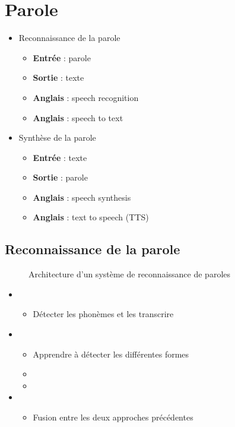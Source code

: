 \documentclass{KodeBook}
\begin{document}
\section{Parole}

\begin{itemize}
	\item Reconnaissance de la parole
	\begin{itemize}
		\item \textbf{Entrée} : parole
		\item \textbf{Sortie} : texte
		\item \textbf{Anglais} : speech recognition
		\item \textbf{Anglais} : speech to text
	\end{itemize}
	\item Synthèse de la parole
	\begin{itemize}
		\item \textbf{Entrée} : texte
		\item \textbf{Sortie} : parole
		\item \textbf{Anglais} : speech synthesis
		\item \textbf{Anglais} : text to speech (TTS)
	\end{itemize}
\end{itemize}

\subsection{Reconnaissance de la parole}


\begin{figure}
	\centering
	\caption{Architecture d'un système de reconnaissance de paroles \cite{18-haridas}}
\end{figure}

\begin{itemize}
	\item {}
	\begin{itemize}
		\item Détecter les phonèmes et les transcrire
	\end{itemize}
	\item {}
	\begin{itemize}
		\item Apprendre à détecter les différentes formes
		\item {} 
		\item {}
	\end{itemize}
	\item {}
	\begin{itemize}
		\item Fusion entre les deux approches précédentes
	\end{itemize}
\end{itemize}
\end{document}
